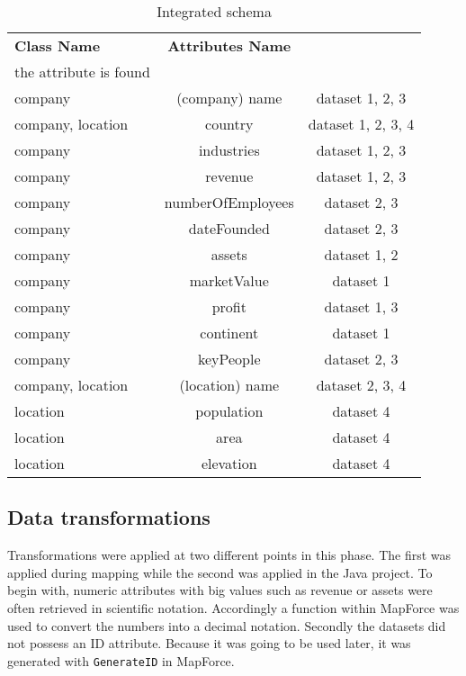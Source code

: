 
\begin{table}[H]
\centering
\begin{tabularx}{\linewidth}{|X|c|c|}
\hline
\textbf{Class Name} & \textbf{Attributes Name} & \textbf{\begin{tabular}[c]{@{}c@{}}Datasets in which\\ the attribute is found\end{tabular}} \\ \hline
company & (company) name & dataset 1, 2, 3 \\ \hline
company, location & country & dataset 1, 2, 3, 4 \\ \hline
company & industries & dataset 1, 2, 3 \\ \hline
company & revenue & dataset 1, 2, 3 \\ \hline
company & numberOfEmployees & dataset 2, 3 \\ \hline
company & dateFounded & dataset 2, 3 \\ \hline
company & assets & dataset 1, 2 \\ \hline
company & marketValue & dataset 1 \\ \hline
company & profit & dataset 1, 3 \\ \hline
company & continent & dataset 1 \\ \hline
company & keyPeople & dataset 2, 3 \\ \hline
company, location & (location) name & dataset 2, 3, 4 \\ \hline
location & population & dataset 4 \\ \hline
location & area & dataset 4 \\ \hline
location & elevation & dataset 4 \\ \hline
\end{tabularx}
\caption{Integrated schema}
\label{my-label}
\end{table}





\subsection{Data transformations}
Transformations were applied at two different points in this phase. The first was applied during mapping while the second was applied in the Java project. To begin with, numeric attributes with big values such as revenue or assets were often retrieved in scientific notation. Accordingly a function within MapForce was used to convert the numbers into a decimal notation. Secondly the datasets did not possess an ID attribute. Because it was going to be used later, it was generated with \texttt{GenerateID} in MapForce. 

